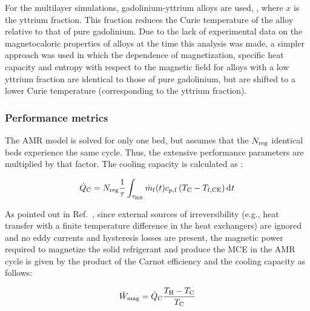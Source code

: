 \documentclass[referee]{svjour3}
\newcommand{\mrate}{\rate{m}}
\begin{document}
For the multilayer simulations, gadolinium-yttrium alloys are used,  , where $x$ is the yttrium fraction.  This fraction reduces the Curie temperature of the alloy relative to that of pure gadolinium. Due to the lack of experimental  data on the magnetocaloric properties of  alloys at the time this analysis was made, a simpler approach was used in which the dependence of magnetization, specific heat capacity and entropy with respect to the magnetic field for alloys with a low yttrium fraction are identical to those of pure gadolinium, but are shifted to a lower Curie temperature (corresponding to the yttrium fraction). 


\subsubsection{Performance metrics}
\label{sec:performance-metrics}

The AMR model is solved for only one bed, but  assumes that the $N_{\mathrm{reg}}$ identical beds experience the same cycle. Thus, the extensive performance parameters are multiplied by that factor. The cooling capacity is calculated as \cite{bib:trevizoli16_perfor_model}:




\begin{equation}
\label{eq:99}
\qc = N\ped{reg}\frac{1}{\tau} \int_{\tau\ped{HB}} \mrate\ped{f}(t) c_{p,\mathrm{f}} \left( T\ped{C} -T\ped{f,CE} \right) \diffd{t}
\end{equation}


\nomenclature[am]{$\mrate\ped{f}$}{mass flow rate [\si{\kg\per\second}]}


As pointed out in Ref.~\cite{bib:fortkamp20-desig}, since external sources of irreversibility (e.g., heat transfer with a finite temperature difference in the heat exchangers) are ignored and no eddy currents and hysteresis losses are present, the magnetic power required to magnetize the solid refrigerant and produce the MCE in the AMR cycle is given by the product of the Carnot efficiency and the cooling capacity as follows:

\begin{equation}
\label{eq:100}
\dot{W}_{\mathrm{mag}} = \dot{Q}_{\mathrm{C}} \frac{T_{\mathrm{H}} - T_{\mathrm{C}}}{T_{\mathrm{C}}}
\end{equation}
\end{document}
